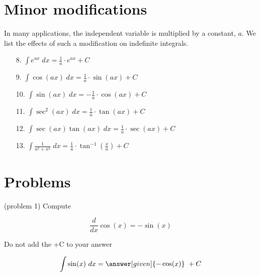\documentclass[handout]{ximera}
\begin{document}
\section{Minor modifications}

In many applications, the independent variable is multiplied by a constant, $a$. 
We list the effects of such a modification on indefinite integrals.

\begin{enumerate}

\item[8.] $\displaystyle{\int e^{ax} \; dx = \frac{1}{a} \cdot e^{ax} + C}$


\item[9.] $\displaystyle{\int \cos(ax) \; dx = \frac{1}{a} \cdot \sin(ax) + C}$

\item[10.] $\displaystyle{\int \sin(ax) \; dx = -\frac{1}{a} \cdot \cos(ax) + C}$

\item[11.] $\displaystyle{\int \sec^2(ax) \; dx = \frac{1}{a} \cdot \tan(ax) + C}$

\item[12.] $\displaystyle{\int \sec(ax)\tan(ax) \; dx = \frac{1}{a} \cdot \sec(ax) + C}$

\item[13.] $\displaystyle{\int \frac{1}{a^2 + x^2} \; dx = \frac{1}{a} \cdot \tan^{-1}\left(\frac{x}{a}\right) + C}$

\end{enumerate}



\section{Problems}






\begin{problem}(problem 1)
Compute
\begin{hint}
\[
\frac{d}{dx} \cos(x) = -\sin(x)
\]
\end{hint}
\begin{hint}
\begin{center}
Do not add the +C to your answer
\end{center}
\end{hint}

\[
\int \sin(x) \ dx =
\answer[given]{-\cos(x)} \ + C
\]
\end{problem}
\end{document}
